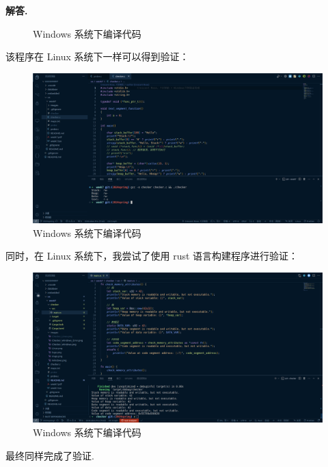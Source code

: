 \documentclass[12pt, a4paper, oneside]{ctexart}
\newenvironment{solution}{\par\noindent\textbf{解答. }}{\par}
\begin{document}
\begin{solution}
\begin{figure}[!htbp]
        \caption{Windows 系统下编译代码}
    \end{figure}
    \newpage
    该程序在 Linux 系统下一样可以得到验证：
    \begin{figure}[!htbp]
        \centering
        \includegraphics[width=13cm]{./images/Checker_Linux.png}
        \caption{Windows 系统下编译代码}
    \end{figure}\newline
    同时，在 Linux 系统下，我尝试了使用 rust 语言构建程序进行验证：
    \begin{figure}[!htbp]
        \centering
        \includegraphics[width=13cm]{./images/Checker_Rust.png}
        \caption{Windows 系统下编译代码}
    \end{figure}\newline
    最终同样完成了验证.
\end{solution}
\end{document}
